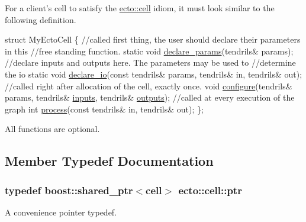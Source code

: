 For a client's cell to satisfy the \hyperlink{structecto_1_1cell}{ecto\-::cell} idiom, it must look similar to the following definition. 
\begin{DoxyCode}
\textcolor{keyword}{struct }MyEctoCell
\{
  \textcolor{comment}{//called first thing, the user should declare their parameters in this}
  \textcolor{comment}{//free standing function.}
  \textcolor{keyword}{static} \textcolor{keywordtype}{void} \hyperlink{structecto_1_1cell_a5c3c204f531de15920cb9d3db3ecfc4c}{declare\_params}(tendrils& params);
  \textcolor{comment}{//declare inputs and outputs here. The parameters may be used to}
  \textcolor{comment}{//determine the io}
  \textcolor{keyword}{static} \textcolor{keywordtype}{void} \hyperlink{structecto_1_1cell_af6c3782ed0d1c258bcf5050b4af272b4}{declare\_io}(\textcolor{keyword}{const} tendrils& params, tendrils& in, tendrils& out);
  \textcolor{comment}{//called right after allocation of the cell, exactly once.}
  \textcolor{keywordtype}{void} \hyperlink{structecto_1_1cell_a30d48d21d6ffa86af4888f78e92241af}{configure}(tendrils& params, tendrils& \hyperlink{structecto_1_1cell_a65099b0458a7761b8bfa7a1ddc17e92f}{inputs}, tendrils& 
      \hyperlink{structecto_1_1cell_a93951743b603faba35312ebdb07ceb22}{outputs});
  \textcolor{comment}{//called at every execution of the graph}
  \textcolor{keywordtype}{int} \hyperlink{structecto_1_1cell_a6b810671ee21f5dddbc1206abfb999f3}{process}(\textcolor{keyword}{const} tendrils& in, tendrils& out);
\};
\end{DoxyCode}


All functions are optional. 

\subsection{Member Typedef Documentation}
\hypertarget{structecto_1_1cell_af2cab9d2bc012088c4f58c40da57a862}{
\subsubsection[{ptr}]{\setlength{\rightskip}{0pt plus 5cm}typedef boost\-::shared\-\_\-ptr$<${\bf cell}$>$ {\bf ecto\-::cell\-::ptr}}}\label{structecto_1_1cell_af2cab9d2bc012088c4f58c40da57a862}


A convenience pointer typedef. 



